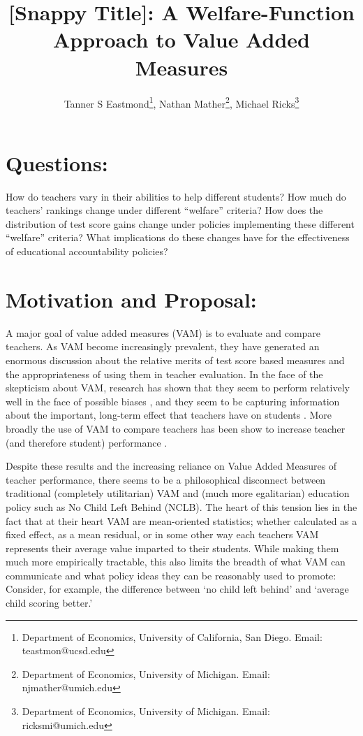 \documentclass[letterpaper,12pt]{article}
\title{[Snappy Title]: A Welfare-Function Approach to Value Added Measures}
\author{Tanner S Eastmond\thanks{Department of Economics, University of California, San Diego. Email: teastmon@ucsd.edu}, Nathan Mather\thanks{Department of Economics, University of Michigan. Email: njmather@umich.edu }, Michael Ricks\thanks{Department of Economics, University of Michigan. Email: ricksmi@umich.edu}}
\date{\vspace{-8ex}}
\begin{document}
\maketitle



\section{Questions:} 
How do teachers vary in their abilities to help different students? How much do teachers' rankings change under different ``welfare'' criteria? How does the distribution of test score gains change under policies implementing these different ``welfare'' criteria? What implications do these changes have for the effectiveness of educational accountability policies? 



\section{Motivation and Proposal:}
A major goal of value added measures (VAM) is to evaluate and compare teachers. As VAM become increasingly prevalent, they have generated an enormous discussion about the relative merits of test score based measures and the appropriateness of using them in teacher evaluation. In the face of the skepticism about VAM, research has shown that they seem to perform relatively well in the face of possible biases \citep{chetty2014measuring1}, and they seem to be capturing information about the important, long-term effect that teachers have on students \citep{chetty2014measuring2}. More broadly the use of VAM to compare teachers has been show to increase teacher (and therefore student) performance \citep{pope2019effect}.

Despite these results and the increasing reliance on Value Added Measures of teacher performance, there seems to be a philosophical disconnect between traditional (completely utilitarian) VAM and (much more egalitarian) education policy such as No Child Left Behind (NCLB). The heart of this tension lies in the fact that at their heart VAM are mean-oriented statistics; whether calculated as a fixed effect, as a mean residual, or in some other way each teachers VAM represents their average value imparted to their students. While making them much more empirically tractable, this also limits the breadth of what VAM can communicate and what policy ideas they can be reasonably used to promote: Consider, for example, the difference between `no child left behind' and `average child scoring better.'
\end{document}
